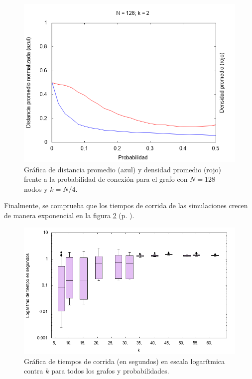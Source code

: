 \documentclass{article}
\begin{document}
  \begin{figure}[h]
    \includegraphics[width=1\textwidth]{N128k002}
    \centering
    \caption{Gráfica de distancia promedio (azul) y densidad promedio (rojo) frente a la probabilidad de conexión para el grafo con $N = 128$ nodos y $k = N / 4$.}
    \label{N128k002}
  \end{figure}

  Finalmente, se comprueba que los tiempos de corrida de las simulaciones crecen de manera exponencial en la figura \ref{Tiempos} (p. \pageref{Tiempos}).

  \begin{figure}[h]
    \includegraphics[width=1\textwidth]{Tiempos}
    \centering
    \caption{Gráfica de tiempos de corrida (en segundos) en escala logarítmica contra $k$ para todos los grafos y probabilidades.}
    \label{Tiempos}
  \end{figure}


  {}
  
\end{document}
